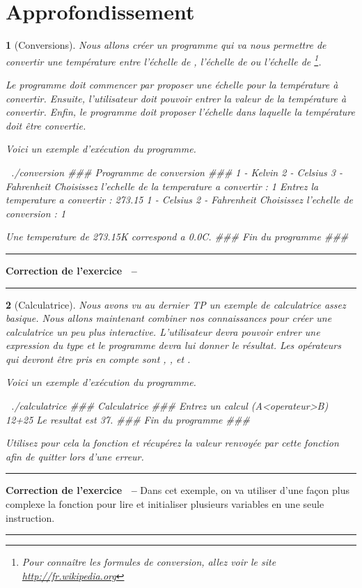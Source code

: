 \documentclass[a4paper]{article}
\newenvironment{Correction}{\par\tiny\blue\rule[1ex]{\textwidth}{1pt}\par\normalsize\textbf{\sffamily{}Correction de l'exercice~\theExo{} -- }}{\par\tiny\blue\rule[1ex]{\textwidth}{1pt}\par}
\newtheorem{Exo}{{\sffamily{Exercice}}}
\begin{document}
	\section{Approfondissement}
		\begin{Exo}[Conversions]
			Nous allons créer un programme qui va nous permettre de convertir une température entre l'échelle de , l'échelle de  ou l'échelle de \footnote{Pour connaître les formules de conversion, allez voir le site \url{http://fr.wikipedia.org}}.

			Le programme doit commencer par proposer une échelle pour la température à convertir.
			Ensuite, l'utilisateur doit pouvoir entrer la valeur de la température à convertir.
			Enfin, le programme doit proposer l'échelle dans laquelle la température doit être convertie.

			Voici un exemple d'exécution du programme.
			\begin{Code*}[language=]
$~$ ./conversion
### Programme de conversion ###
1 - Kelvin
2 - Celsius
3 - Fahrenheit
Choisissez l'echelle de la temperature a convertir : 1
Entrez la temperature a convertir : 273.15
1 - Celsius
2 - Fahrenheit
Choisissez l'echelle de conversion : 1

Une temperature de 273.15K correspond a 0.0C.
### Fin du programme ###
$~$
			\end{Code*}
		\end{Exo}
		\begin{Correction}
		\end{Correction}
		\begin{Exo}[Calculatrice]
			Nous avons vu au dernier TP un exemple de calculatrice assez basique.
			Nous allons maintenant combiner nos connaissances pour créer une calculatrice un peu plus interactive.
			L'utilisateur devra pouvoir entrer une expression du type  et le programme devra lui donner le résultat.
			Les opérateurs qui devront être pris en compte sont , ,  et .

			Voici un exemple d'exécution du programme.
			\begin{Code*}[language=]
$~$ ./calculatrice
### Calculatrice ###
Entrez un calcul (A<operateur>B)
12+25
Le resultat est 37.
### Fin du programme ###
$~$
			\end{Code*}
			Utilisez pour cela la fonction  et récupérez la valeur renvoyée par cette fonction afin de quitter lors d'une erreur.
		\end{Exo}
		\begin{Correction}
			Dans cet exemple, on va utiliser d'une façon plus complexe la fonction  pour lire et initialiser plusieurs variables en une seule instruction.
		\end{Correction}
\end{document}
